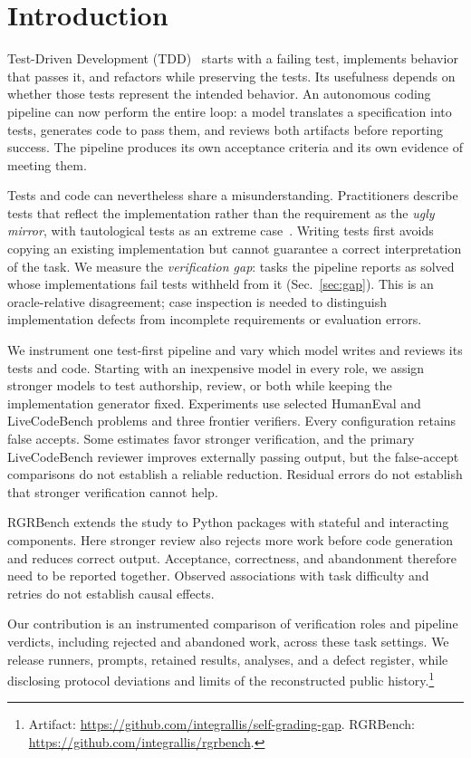 \section{Introduction}
\label{sec:intro}

Test-Driven Development (TDD)~\cite{beck2002tdd} starts with a failing test, implements
behavior that passes it, and refactors while preserving the tests. Its usefulness depends
on whether those tests represent the intended behavior. An autonomous coding pipeline
can now perform the entire loop: a model translates a specification into tests, generates
code to pass them, and reviews both artifacts before reporting success. The pipeline
produces its own acceptance criteria and its own evidence of meeting them.

Tests and code can nevertheless share a misunderstanding. Practitioners describe tests
that reflect the implementation rather than the requirement as the \emph{ugly mirror},
with tautological tests as an extreme case~\cite{rudolph2008uglymirror,pereira2010ttdd}.
Writing tests first avoids copying an existing implementation but cannot guarantee a
correct interpretation of the task. We measure the \emph{verification gap}: tasks the
pipeline reports as solved whose implementations fail tests withheld from it
(Sec.~\ref{sec:gap}). This is an oracle-relative disagreement; case inspection is needed
to distinguish implementation defects from incomplete requirements or evaluation errors.

We instrument one test-first pipeline and vary which model writes and reviews its tests
and code. Starting with an inexpensive model in every role, we assign stronger models
to test authorship, review, or both while keeping the implementation generator fixed.
Experiments use selected HumanEval and LiveCodeBench problems and three frontier
verifiers. Every configuration retains false accepts. Some estimates favor stronger
verification, and the primary LiveCodeBench reviewer improves externally passing output,
but the false-accept comparisons do not establish a reliable reduction. Residual errors
do not establish that stronger verification cannot help.

RGRBench extends the study to Python packages with stateful and interacting components.
Here stronger review also rejects more work before code generation and reduces correct
output. Acceptance, correctness, and abandonment therefore need to be reported together.
Observed associations with task difficulty and retries do not establish causal effects.

Our contribution is an instrumented comparison of verification roles and pipeline verdicts,
including rejected and abandoned work, across these task settings. We release runners,
prompts, retained results, analyses, and a defect register, while disclosing protocol
deviations and limits of the reconstructed public history.\footnote{Artifact:
\url{https://github.com/integrallis/self-grading-gap}.
RGRBench: \url{https://github.com/integrallis/rgrbench}.}
